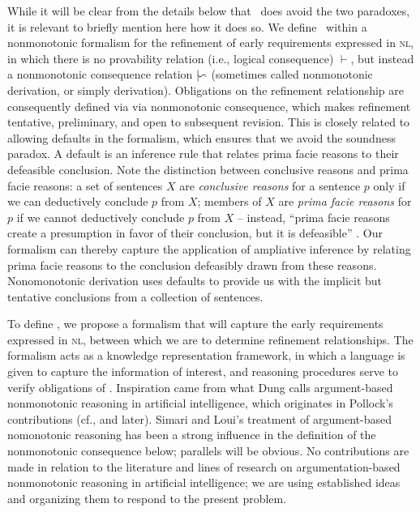 \documentclass[10pt, conference, compsocconf]{IEEEtran}
\begin{document}
While it will be clear from the details below that \nlref\ does avoid the two paradoxes, it is relevant to briefly mention here how it does so. We define \nlref\ within a nonmonotonic formalism for the refinement of early requirements expressed in \textsc{nl}, in which there is no provability relation (i.e., logical consequence) $\vdash$, but instead a nonmonotonic consequence relation $\mid\negthinspace\backsim$ (sometimes called nonmonotonic derivation, or simply derivation). Obligations on the refinement relationship are consequently defined via via nonmonotonic consequence, which makes refinement tentative, preliminary, and open to subsequent revision. This is closely related to allowing defaults in the formalism, which ensures that we avoid the soundness paradox. A default is an inference rule that relates prima facie reasons to their defeasible conclusion. Note the distinction between conclusive reasons and prima facie reasons: a set of sentences $X$ are \textit{conclusive reasons} for a sentence $p$ only if we can deductively conclude $p$ from $X$; members of $X$ are \textit{prima facie reasons} for $p$ if we cannot deductively conclude $p$ from $X$ -- instead, ``prima facie reasons create a presumption in favor of their conclusion, but it is defeasible'' \cite{Pollock:1994:AIJ}. Our formalism can thereby capture the application of ampliative inference by relating prima facie reasons to the conclusion defeasibly drawn from these reasons. Nonomonotonic derivation uses defaults to provide us with the implicit but tentative conclusions from a collection of sentences. 

To define \nlref, we propose a formalism that will capture the early requirements expressed in \textsc{nl}, between which we are to determine refinement relationships. The formalism acts as a knowledge representation framework, in which a language is given to capture the information of interest, and reasoning procedures serve to verify obligations of \nlref. Inspiration came from what Dung \cite{Dung:1995:AIJ} calls argument-based nonmonotonic reasoning in artificial intelligence, which originates in Pollock's contributions (cf., \cite{Pollock+:1987:CogSci} and later). Simari and Loui's treatment of argument-based nomonotonic reasoning \cite{Simari+:1992:AIJ} has been a strong influence in the definition of the nonmonotonic consequence below; parallels will be obvious. No contributions are made in relation to the literature and lines of research on argumentation-based nonmonotonic reasoning in artificial intelligence; we are using established ideas and organizing them to respond to the present problem. 
\end{document}
